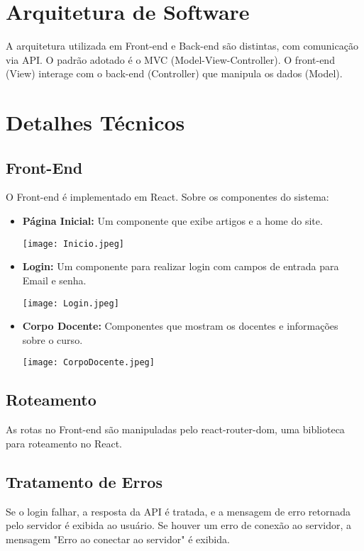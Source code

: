 \documentclass[a4paper,12pt]{report}
\begin{document}
\section{Arquitetura de Software} 
A arquitetura utilizada em Front-end e Back-end são distintas, com comunicação via API. O padrão adotado é o MVC (Model-View-Controller). O front-end (View) interage com o back-end (Controller) que manipula os dados (Model). 

\section{Detalhes Técnicos}
\subsection{Front-End} 
O Front-end é implementado em React. 
Sobre os componentes do sistema: 
\begin{itemize} 
    \item \textbf{Página Inicial:} Um componente que exibe artigos e a home do site.
    \begin{center}
        \texttt{[image: Inicio.jpeg]}
    \end{center}
    
    \item \textbf{Login:} Um componente para realizar login com campos de entrada para Email e senha.
    \begin{center}
        \texttt{[image: Login.jpeg]}
    \end{center}
    
    \item \textbf{Corpo Docente:} Componentes que mostram os docentes e informações sobre o curso. 
    \begin{center}
        \texttt{[image: CorpoDocente.jpeg]}
    \end{center}
\end{itemize}

\subsection{Roteamento} 
As rotas no Front-end são manipuladas pelo react-router-dom, uma biblioteca para roteamento no React. 

\subsection{Tratamento de Erros} 
Se o login falhar, a resposta da API é tratada, e a mensagem de erro retornada pelo servidor é exibida ao usuário. Se houver um erro de conexão ao servidor, a mensagem "Erro ao conectar ao servidor" é exibida. 
\end{document}
